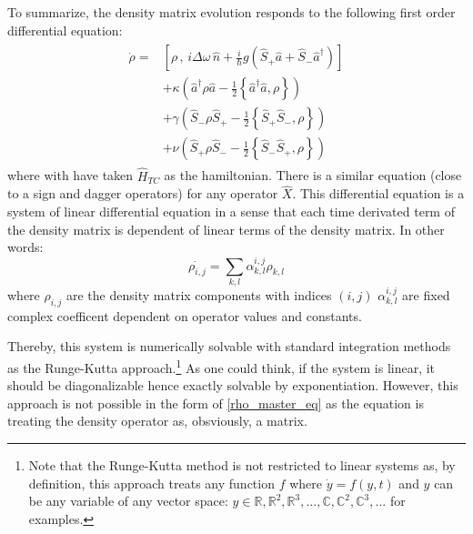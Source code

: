 \documentclass[11pt]{report}
\begin{document}
To summarize, the density matrix evolution responds to the following first order differential equation:
\begin{align}
\label{rho_master_eq}
\begin{split}
\dot{\rho} = &\left[ \rho \, , \, i\Delta\omega\,\hat{n} + \frac{i}{\hbar} g \left(\hat{S}_+ \hat{a} + \hat{S}_-\hat{a}^{\dag} \right)\right]\\
&+ \kappa \left( \hat{a}^\dagger \rho \hat{a} - \frac{1}{2} \left\lbrace \hat{a}^\dagger \hat{a}, \rho \right\rbrace \right)\\
&+ \gamma \left( \hat{S}_- \rho \hat{S}_+ - \frac{1}{2} \left\lbrace \hat{S}_+ \hat{S}_-, \rho \right\rbrace \right)\\
&+ \nu \left( \hat{S}_+ \rho \hat{S}_- - \frac{1}{2} \left\lbrace \hat{S}_- \hat{S}_+, \rho \right\rbrace \right)
\end{split}
\end{align}
where with have taken $\hat{H}_{TC}$ as the hamiltonian. There is a similar equation (close to a sign and dagger operators) for any operator $\hat{X}$. This differential equation is a system of linear differential equation in a sense that each time derivated term of the density matrix is dependent of linear terms of the density matrix. In other words:
\begin{equation}
\dot{\rho_{i,j}} = \sum_{k,l} \alpha_{k,l}^{i,j} \rho_{k,l}
\end{equation}
where $\rho_{i,j}$ are the density matrix components with indices $(i,j)$ $\alpha_{k,l}^{i,j}$ are fixed complex coefficent dependent on operator values and constants. 

Thereby, this system is numerically solvable with standard integration methods as the Runge-Kutta approach.\footnote{Note that the Runge-Kutta method is not restricted to linear systems as, by definition, this approach treats any function $f$ where $\dot{y} = f(y, t)$ and $y$ can be any variable of any vector space: $y \in \mathbb{R}, \mathbb{R}^2, \mathbb{R}^3, ..., \mathbb{C}, \mathbb{C}^2, \mathbb{C}^3, ...$ for examples.} As one could think, if the system is linear, it should be diagonalizable hence exactly solvable by exponentiation. However, this approach is not possible in the form of \eqref{rho_master_eq} as the equation is treating the density operator as, obsviously, a matrix. 
\end{document}

